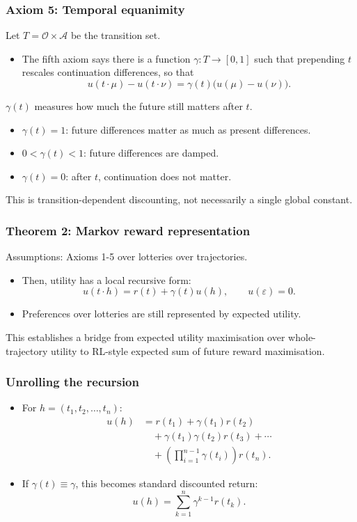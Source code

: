 \documentclass[10pt,a4paper]{beamer}
\newcommand{\Ofin}{\mathcal{O}}
\newcommand{\Afin}{\mathcal{A}}
\newcommand{\emptytraj}{\varepsilon}
\begin{document}
\begin{frame}
\frametitle{Axiom 5: Temporal equanimity}
Let $T=\Ofin\times\Afin$ be the transition set.
\begin{itemize}
    \item The fifth axiom says there is a function $\gamma:T\to[0,1]$ such that
    prepending $t$ rescales continuation differences, so that
    $$
    u(t\cdot\mu)-u(t\cdot\nu)
    =
    \gamma(t)\bigl(u(\mu)-u(\nu)\bigr).
    $$
\end{itemize}
$\gamma(t)$ measures how much the future still matters after $t$. 
\vspace{0.1cm}
\pause
\begin{itemize}
    \item $\gamma(t)=1$: future differences matter as much as present differences.
    \pause
    \item $0<\gamma(t)<1$: future differences are damped.
    \pause
    \item $\gamma(t)=0$: after $t$, continuation does not matter.
\end{itemize}
This is transition-dependent discounting, not necessarily a single
global constant.
\end{frame}


\begin{frame}
\frametitle{Theorem 2: Markov reward representation}
Assumptions: Axioms 1-5 over lotteries over trajectories.
\begin{itemize}
    \item Then, utility has a local recursive form:
    $$
    u(t\cdot h)=r(t)+\gamma(t)u(h),
    \qquad
    u(\emptytraj)=0.
    $$
    \pause
    \item Preferences over lotteries are still represented by expected utility.
    \pause
\end{itemize}
This establishes a bridge from expected utility maximisation over whole-trajectory utility 
to RL-style expected sum of future reward maximisation.
\end{frame}

\begin{frame}
\frametitle{Unrolling the recursion}
\begin{itemize}
    \item For $h=(t_1,t_2,\dots,t_n)$:
    \begin{align*}
    u(h)
    &= r(t_1)+\gamma(t_1)r(t_2)\\
    &\quad+\gamma(t_1)\gamma(t_2)r(t_3)+\cdots\\
    &\quad+\left(\prod_{i=1}^{n-1}\gamma(t_i)\right)r(t_n).
    \end{align*}
    \pause
    \item If $\gamma(t)\equiv\gamma$, this becomes standard discounted return:
    $$
    u(h)=\sum_{k=1}^n\gamma^{k-1}r(t_k).
    $$
\end{itemize}
\end{frame}
\end{document}
